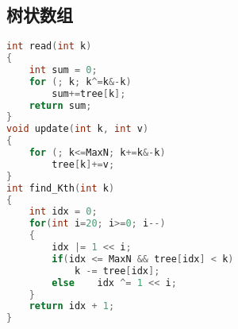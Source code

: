 \subsection{树状数组}
	\begin{lstlisting}[language=c++]
int read(int k)
{
	int sum = 0;
	for (; k; k^=k&-k)
		sum+=tree[k];
	return sum;
}
void update(int k, int v)
{
	for (; k<=MaxN; k+=k&-k)
		tree[k]+=v;
}
int find_Kth(int k)
{
	int idx = 0;
	for(int i=20; i>=0; i--)
	{
		idx |= 1 << i;
		if(idx <= MaxN && tree[idx] < k)
			k -= tree[idx];
		else	idx ^= 1 << i;
	}
	return idx + 1;
}
	\end{lstlisting}
